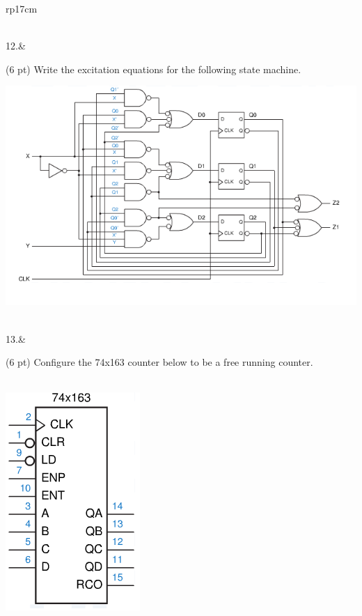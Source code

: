 \documentclass{article}
\begin{document}
\begin{longtable}[l]{rp{17cm}}
\begin{minipage}[t]{\linewidth}
\vspace{8cm
}
\end{minipage}\\
\medskip
12.&\begin{minipage}[t]{\linewidth}(6 pt) Write the excitation equations for the following state machine.
\begin{center}
  \includegraphics[scale=0.7]{../StateMachines/Assessments/Wakerly_7_43}
\end{center}

\vspace{8cm
}
\end{minipage}\\
\medskip
13.&\begin{minipage}[t]{\linewidth}(6 pt) Configure the 74x163 counter below to be a free running counter. \\ \\
\begin{center}
  \includegraphics[scale=0.5]{../Counters/Assessments/74x163Schematic}
\end{center}


\end{minipage}
\end{longtable}
\end{document}
